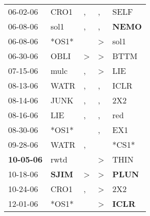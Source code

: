 \begin{supertabular}{p{0.07\textwidth}p{0.06\textwidth}p{0.02\textwidth}p{0.02\textwidth}p{0.06\textwidth}}
          06-02-06\textsuperscript{} &           CRO1\textsuperscript{} &                , &                , &           SELF\textsuperscript{} \\
          06-08-06\textsuperscript{} &           sol1\textsuperscript{} &                , &                , &  \textbf{NEMO\textsuperscript{}} \\
          06-08-06\textsuperscript{} &                            *OS1* &                  &     \textgreater &           sol1\textsuperscript{} \\
          06-30-06\textsuperscript{} &           OBLI\textsuperscript{} &     \textgreater &     \textgreater &           BTTM\textsuperscript{} \\
          07-15-06\textsuperscript{} &           mulc\textsuperscript{} &                , &     \textgreater &            LIE\textsuperscript{} \\
          08-13-06\textsuperscript{} &           WATR\textsuperscript{} &                , &                , &           ICLR\textsuperscript{} \\
          08-14-06\textsuperscript{} &           JUNK\textsuperscript{} &                , &                , &            2X2\textsuperscript{} \\
          08-16-06\textsuperscript{} &            LIE\textsuperscript{} &                , &                , &            red\textsuperscript{} \\
          08-30-06\textsuperscript{} &                            *OS1* &                  &                , &            EX1\textsuperscript{} \\
          09-28-06\textsuperscript{} &           WATR\textsuperscript{} &                , &                  &                            *CS1* \\
 \textbf{10-05-06\textsuperscript{}} &           rwtd\textsuperscript{} &                  &     \textgreater &           THIN\textsuperscript{} \\
          10-18-06\textsuperscript{} &  \textbf{SJIM\textsuperscript{}} &     \textgreater &     \textgreater &  \textbf{PLUN\textsuperscript{}} \\
          10-24-06\textsuperscript{} &           CRO1\textsuperscript{} &                , &     \textgreater &            2X2\textsuperscript{} \\
          12-01-06\textsuperscript{} &                            *OS1* &                  &     \textgreater &  \textbf{ICLR\textsuperscript{}} \\

\end{supertabular}
